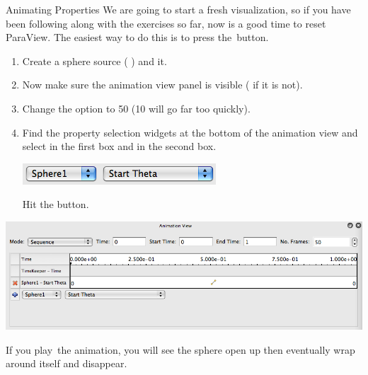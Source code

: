 \begin{exercise}{Animating Properties}
  \label{ex:AnimatingProperties}%
  We are going to start a fresh visualization, so if you have been
  following along with the exercises so far, now is a good time to reset
  ParaView.  The easiest way to do this is to press the~\disconnect button.

  \begin{enumerate}
  \item Create a sphere source ( \ra {}) and \apply it.
  \item Now make sure the animation view panel is visible ( \ra
     if it is not).
  \item Change the  option to 50 (10 will go far too quickly).
  \item Find the property selection widgets at the bottom of the animation
    view and select  in the first box and  in
    the second box.
    \begin{inlinefig}
      \includegraphics[height=1.5\baselineskip]{images/AddStartThetaTrack}
    \end{inlinefig}
    Hit the  button.
  \end{enumerate}

  \begin{inlinefig}
    \includegraphics[width=.9\linewidth]{images/BuildAnimation1}
  \end{inlinefig}

  If you play~\vcrPlay the animation, you will see the sphere open up then
  eventually wrap around itself and disappear.


\end{exercise}
